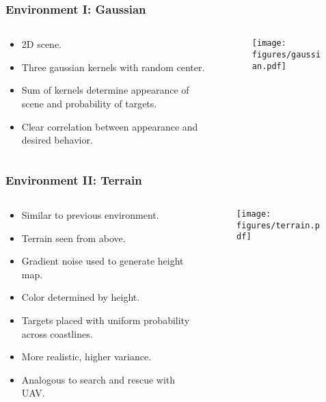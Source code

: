 \begin{frame}
    \frametitle{Environment I: Gaussian}
    \begin{columns}
        \begin{column}{0.5\textwidth}
            \begin{itemize}
                \item 2D scene.
                \item Three gaussian kernels with random center.
                \item Sum of kernels determine appearance of scene and probability of targets.
                \item Clear correlation between appearance and desired behavior.
            \end{itemize}
        \end{column}
        \begin{column}{0.5\textwidth}
            \begin{figure}
                \centering
                \texttt{[image: figures/gaussian.pdf]}
            \end{figure}
        \end{column}
    \end{columns}    
\end{frame}

\begin{frame}
    \frametitle{Environment II: Terrain}
    \begin{columns}
        \begin{column}{0.5\textwidth}
            \begin{itemize}
                \item Similar to previous environment.
                \item Terrain seen from above.
                \item Gradient noise used to generate height map.
                \item Color determined by height.
                \item Targets placed with uniform probability across coastlines.
                \item More realistic, higher variance.
                \item Analogous to search and rescue with UAV.
            \end{itemize}
        \end{column}
        \begin{column}{0.5\textwidth}
            \begin{figure}
                \centering
                \texttt{[image: figures/terrain.pdf]}
            \end{figure}
        \end{column}
    \end{columns}   
\end{frame}

